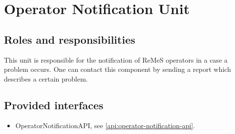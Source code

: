 \section{Operator Notification Unit}
\label{element:operator-notification-unit}

\subsection{Roles and responsibilities}

\npar This unit is responsible for the notification of ReMeS operators in a case
a problem occurs. One can contact this component by sending a report which
describes a certain problem.

\subsection{Provided interfaces}

\begin{itemize}
  \item OperatorNotificationAPI, see \ref{api:operator-notification-api}.
\end{itemize}



